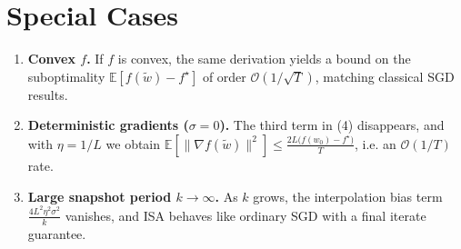 \documentclass{article}
\begin{document}
\section*{Special Cases}
\begin{enumerate}[label=(\alph*)]
\item \textbf{Convex $f$.}  
    If $f$ is convex, the same derivation yields a bound on the
    suboptimality $ \mathbb{E}[f(\tilde w)-f^{\star}]$ of order
    $\mathcal{O}(1/\sqrt{T})$, matching classical SGD results.
\item \textbf{Deterministic gradients ($\sigma=0$).}  
    The third term in (4) disappears, and with $\eta=1/L$ we obtain
    $\mathbb{E}[\|\nabla f(\tilde w)\|^{2}]\le
    \frac{2L\big(f(w_0)-f^{\star}\big)}{T}$, i.e. an $\mathcal{O}(1/T)$ rate.
\item \textbf{Large snapshot period $k\to\infty$.}  
    As $k$ grows, the interpolation bias term $\frac{4L^{2}\eta^{2}\sigma^{2}}{k}$
    vanishes, and ISA behaves like ordinary SGD with a final iterate
    guarantee.
\end{enumerate}

\end{document}
